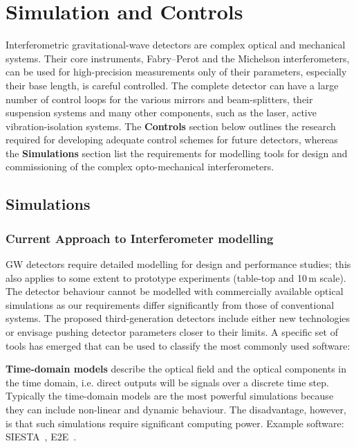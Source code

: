 \chapter{Simulation and Controls}
\label{sec:Sim_Controls}

Interferometric gravitational-wave detectors are complex optical and mechanical systems. Their core instruments, Fabry–Perot and the Michelson interferometers, can be used for high-precision measurements only of their parameters, especially their base length, is careful controlled. 
The complete detector can have a large number of control loops for the various mirrors and beam-splitters, their suspension systems and many other components, such as the laser, active vibration-isolation systems. The \textbf{Controls} section below outlines the research required for developing adequate control schemes for future detectors, whereas the \textbf{Simulations} section list the requirements for modelling tools for design and commissioning of the complex opto-mechanical interferometers.

\section{Simulations}
\subsection{Current Approach to Interferometer modelling}
GW detectors require detailed modelling for design and performance studies; this also applies to some extent to prototype experiments (table-top and 10\,m scale). The detector behaviour cannot be modelled with commercially available optical simulations as our requirements differ significantly from those of conventional systems. The proposed third-generation detectors include either new technologies or envisage pushing detector parameters closer to their limits. 
A specific set of tools has emerged that can be used to classify the most commonly used software:

\textbf{Time-domain models} describe the optical field and the optical components in the time domain, i.e. direct outputs will be signals over a discrete time step. Typically the time-domain models are the most powerful   simulations because they can include non-linear and dynamic behaviour.
The disadvantage, however, is that such simulations require significant computing power. Example software: SIESTA~\cite{SIESTA}, E2E~\cite{e2e_2000}.

